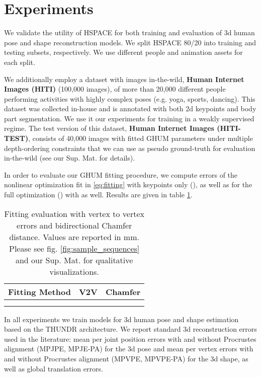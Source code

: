 \documentclass[10pt,twocolumn,letterpaper]{article}
\begin{document}
\section{Experiments}

We validate the utility of HSPACE for both training and evaluation of 3d human pose and shape reconstruction models.
We split HSPACE 80/20 into training and testing subsets, respectively. We use different people and animation assets for each split.

We additionally employ a dataset with images in-the-wild, \textbf{Human Internet Images (HITI)} (100,000 images), of more than 20,000 different people performing activities with highly complex poses (e.g. yoga, sports, dancing). This dataset was collected in-house and is annotated with both 2d keypoints and body part segmentation. We use it our experiments for training in a weakly supervised regime. The test version of this dataset, \textbf{Human Internet Images (HITI-TEST)}, consists of 40,000 images with fitted GHUM parameters under multiple depth-ordering constraints that we can use as pseudo ground-truth for evaluation in-the-wild (see our Sup. Mat. for details). 

 In order to evaluate our GHUM fitting procedure, we compute errors of the nonlinear optimization fit in \eqref{eq:fitting} with keypoints only (), as well as for the full optimization () with  as well. Results are given in table \ref{tbl:ghum_fitting_errrors}.

\begin{table}[!htbp]
    \small
    \centering
    \begin{tabular}[t]{|l||r|r|}
    \hline
    \textbf{Fitting Method}  & V2V & Chamfer \\
    \hline
     &  &  \\
    \hline
     &  &  \\
    \hline
    \end{tabular}

    \caption{\small Fitting evaluation with vertex to vertex errors and bidirectional Chamfer distance. Values are reported in mm. Please see fig. \ref{fig:sample_sequences} and our Sup. Mat. for qualitative visualizations.}
\label{tbl:ghum_fitting_errrors}
\end{table}


In all experiments we train models for 3d human pose and shape estimation based on the THUNDR architecture\cite{Zanfir_2021_ICCV}. We report standard 3d reconstruction errors used in the literature: mean per joint position errors with and without Procrustes alignment (MPJPE, MPJE-PA) for the 3d pose and mean per vertex errors with and without Procrustes alignment (MPVPE, MPVPE-PA) for the 3d shape, as well as global translation errors. 
\end{document}

